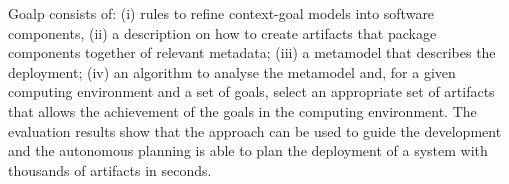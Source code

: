Goalp consists of: (i) rules to refine context-goal models into software components, (ii) a description on how to create artifacts that package components together of relevant metadata; (iii) a metamodel that describes the deployment; (iv) an algorithm to analyse the metamodel and, for a given computing environment and a set of goals, select an appropriate set of artifacts that allows the achievement of the goals in the computing environment. The evaluation results show that the approach can be used to guide the development and the autonomous planning is able to plan the deployment of a system with thousands of artifacts in seconds.





